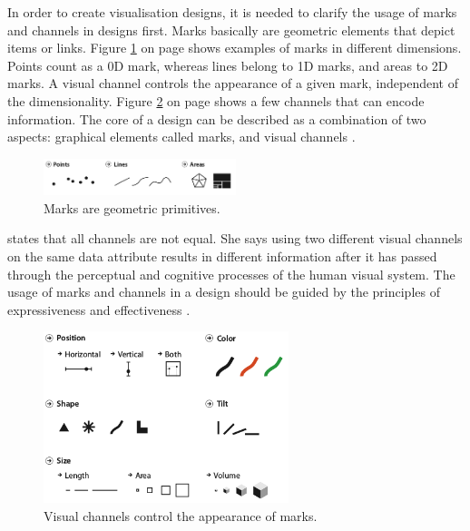 In order to create visualisation designs, it is needed to clarify the usage of marks and channels in designs first. Marks basically are geometric elements that depict items or links. Figure \ref{fig:va-marks} on page \pageref{fig:va-marks} shows examples of marks in different dimensions. Points count as a 0D mark, whereas lines belong to 1D marks, and areas to 2D marks. A visual channel controls the appearance of a given mark, independent of the dimensionality. Figure \ref{fig:va-channels} on page \pageref{fig:va-channels} shows a few channels that can encode information. The core of a design can be described as a combination of two aspects: graphical elements called marks, and visual channels .

\begin{figure}[!htb]
\centering
\includegraphics[width=0.5\textwidth,keepaspectratio]{images/va/marks.png}
\caption[
    Marks are geometric primitives .
]{Marks are geometric primitives.}
\label{fig:va-marks}
\end{figure}

\citeauthor{Munzner2014} states that all channels are not equal. She says using two different visual channels on the same data attribute results in different information after it has passed through the perceptual and cognitive processes of the human visual system. The usage of marks and channels in a design should be guided by the principles of expressiveness and effectiveness .

\begin{figure}[!htb]
\centering
\includegraphics[height=5cm,keepaspectratio]{images/va/channels.png}
\caption[
    Visual channels control the appearance of marks .
]{Visual channels control the appearance of marks.}
\label{fig:va-channels}
\end{figure}


